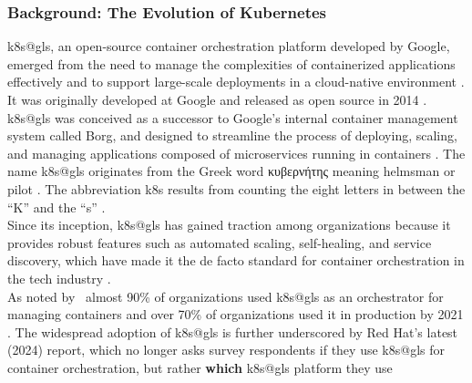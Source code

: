 \documentclass[11pt, a4paper, oneside, listof=totoc]{scrartcl}
\begin{document}
            \subsubsection{Background: The Evolution of Kubernetes}\label{subsubsec:k8sEvolution}
                \gls{k8s@gls}, an open-source \gls{container} orchestration platform developed by
                Google, emerged from the need to manage the complexities of containerized
                applications effectively and to support large-scale deployments in a cloud-native
                environment \parencites{googlecloudWhatIsKubernetes}{kubernetesOverview}.
                It was originally developed at Google and released as open source in 2014
                \parencite{googlecloudWhatIsKubernetes}.
                \gls{k8s@gls} was conceived as a successor to Google's internal \gls{container}
                management system called Borg, and designed to streamline the process of deploying,
                scaling, and managing applications composed of microservices running in containers
                \parencites[pp.~13--14]{verma2015}[p.~84]{bernstein2014}.
                The name \gls{k8s@gls} originates from the Greek word \textgreek{κυβερνήτης} meaning
                helmsman or pilot \parencite{kubernetesOverview}.
                The abbreviation \gls{k8s} results from counting the eight letters in between the
                \enquote{K} and the \enquote{s} \parencite{kubernetesOverview}.
                \\
                Since its inception, \gls{k8s@gls} has gained traction among organizations because it
                provides robust features such as automated scaling,
                self-healing, and service discovery, which have made it the de facto standard for
                \gls{container} orchestration in the tech industry
                \parencite[pp.~855--858]{damarapati2025}.
                \\
                As noted by~\cite[p.~457]{moravcik2022} almost 90\% of organizations used
                \gls{k8s@gls} as an orchestrator for managing containers and over 70\% of organizations
                used it in production by 2021 \parencite{redhatStateOfK8sSecurityReport2021}.
                The widespread adoption of \gls{k8s@gls} is further underscored by Red Hat's latest
                (2024) report, which no longer asks survey respondents if they use \gls{k8s@gls} for
                \gls{container} orchestration, but rather \textbf{which} \gls{k8s@gls} platform they use
\end{document}
